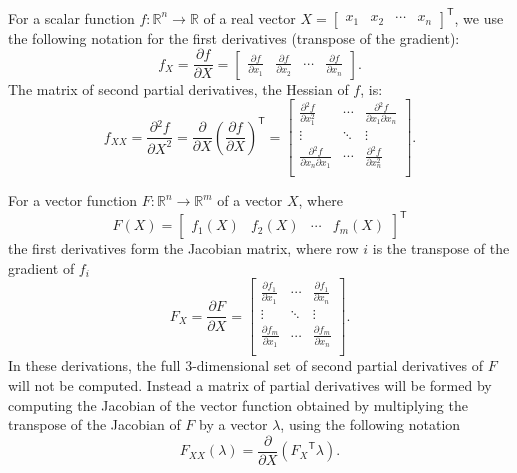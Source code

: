 \documentclass[12pt]{article}
\newcommand{\trans}[1]{{#1}^{\ensuremath{\mathsf{T}}}}  %
\newcommand{\R}{\mathbb{R}}          %
\newcommand{\der}[2]{\frac{\partial{#1}}{\partial{#2}}} %
\numberwithin{equation}{section}
\numberwithin{table}{section}
\numberwithin{figure}{section}
\begin{document}
For a scalar function $f \colon \R^n \to \R$ of a real vector $X = \trans{\left[\begin{array}{cccc}x_1 & x_2 & \cdots & x_n\end{array}\right]}$, we use the following notation for the first derivatives (transpose of the gradient):
\begin{equation}
f_X = \der{f}{X} = \left[\begin{array}{cccc}
\der{f}{x_1} &
\der{f}{x_2} &
\cdots &
\der{f}{x_n}
\end{array}\right].
\end{equation}
The matrix of second partial derivatives, the Hessian of $f$, is:
\begin{equation}
f_{XX} = \der{^2f}{X^2} = \der{}{X}\trans{\left( \der{f}{X} \right)}
= \left[\begin{array}{cccc}
\der{^2f}{x_1^2} &
\cdots &
\der{^2f}{x_1 \partial x_n} \\
\vdots &
\ddots &
\vdots \\
\der{^2f}{x_n \partial x_1} &
\cdots &
\der{^2f}{x_n^2} \\
\end{array}\right].
\end{equation}

For a vector function $F \colon \R^n \to \R^m$ of a vector $X$, where
\begin{equation}
F(X) = \trans{\left[\begin{array}{cccc}
f_1(X) & f_2(X) & \cdots & f_m(X)
\end{array}\right]}
\end{equation}
the first derivatives form the Jacobian matrix, where row $i$ is the transpose of the gradient of $f_i$
\begin{equation}
F_X = \der{F}{X} = \left[\begin{array}{cccc}
\der{f_1}{x_1} &
\cdots &
\der{f_1}{x_n} \\
\vdots &
\ddots &
\vdots \\
\der{f_m}{x_1} &
\cdots &
\der{f_m}{x_n} \\
\end{array}\right].
\end{equation}
In these derivations, the full 3-dimensional set of second partial derivatives of $F$ will not be computed. Instead a matrix of partial derivatives will be formed by computing the Jacobian of the vector function obtained by multiplying the transpose of the Jacobian of $F$ by a vector $\lambda$, using the following notation
\begin{equation}
F_{XX}(\lambda) = \der{}{X} \left( \trans{F_X} \lambda \right).
\end{equation}
\end{document}
